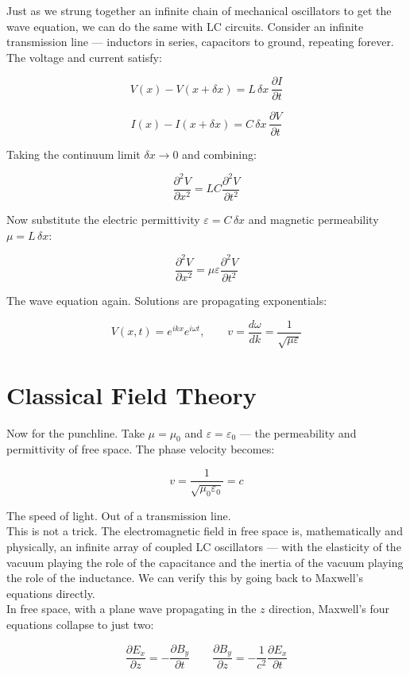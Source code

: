 \documentclass[krantz1,ChapterTOCs]{krantz}
\begin{document}
Just as we strung together an infinite chain of mechanical oscillators to get the wave equation, we can do the same with LC circuits. Consider an infinite transmission line --- inductors in series, capacitors to ground, repeating forever. The voltage and current satisfy:

$$V(x) - V(x+\delta x) = L\,\delta x\,\frac{\partial I}{\partial t}$$

$$I(x) - I(x+\delta x) = C\,\delta x\,\frac{\partial V}{\partial t}$$

Taking the continuum limit $\delta x \to 0$ and combining:

$$\frac{\partial^2 V}{\partial x^2} = LC\frac{\partial^2 V}{\partial t^2}$$

Now substitute the electric permittivity $\varepsilon = C\,\delta x$ and magnetic permeability $\mu = L\,\delta x$:

$$\frac{\partial^2 V}{\partial x^2} = \mu\varepsilon\frac{\partial^2 V}{\partial t^2}$$

The wave equation again. Solutions are propagating exponentials:

$$V(x,t) = e^{ikx}e^{i\omega t}, \qquad v = \frac{d\omega}{dk} = \frac{1}{\sqrt{\mu\varepsilon}}$$

\section*{Classical Field Theory}

Now for the punchline. Take $\mu = \mu_0$ and $\varepsilon = \varepsilon_0$ --- the permeability and permittivity of free space. The phase velocity becomes:

$$v = \frac{1}{\sqrt{\mu_0\varepsilon_0}} = c$$

The speed of light. Out of a transmission line.\\

This is not a trick. The electromagnetic field in free space is, mathematically and physically, an infinite array of coupled LC oscillators --- with the elasticity of the vacuum playing the role of the capacitance and the inertia of the vacuum playing the role of the inductance. We can verify this by going back to Maxwell's equations directly.\\

In free space, with a plane wave propagating in the $z$ direction, Maxwell's four equations collapse to just two:

$$\frac{\partial E_x}{\partial z} = -\frac{\partial B_y}{\partial t} \qquad \frac{\partial B_y}{\partial z} = -\frac{1}{c^2}\frac{\partial E_x}{\partial t}$$
\end{document}
